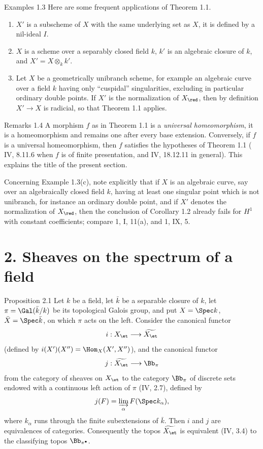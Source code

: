 \begin{remarktext}{Examples 1.3}
Here are some frequent applications of Theorem 1.1.
\begin{enumerate}[label=\alph*)]
\item \(X'\) is a subscheme of \(X\) with the same underlying set as \(X\), \ie it is defined by a nil-ideal \(I\).
\item \(X\) is a scheme over a separably closed field \(k\), \(k'\) is an algebraic closure of \(k\), and \(X'=X\otimes_k k'\).
\item Let \(X\) be a geometrically unibranch scheme, for example an algebraic curve over a field \(k\) having only ``cuspidal'' singularities, excluding in particular ordinary double points. If \(X'\) is the normalization of \(X_{\red}\), then by definition \(X'\to X\) is radicial, so that Theorem 1.1 applies.
\end{enumerate}
\end{remarktext}

\begin{remarktext}{Remarks 1.4}
A morphism \(f\) as in Theorem 1.1 is a \emph{universal homeomorphism}, \ie it is a homeomorphism and remains one after every base extension. Conversely, if \(f\) is a universal homeomorphism, then \(f\) satisfies the hypotheses of Theorem 1.1 (\cf \EGA{} IV, 8.11.6 when \(f\) is of finite presentation, and \EGA{} IV, 18.12.11 in general). This explains the title of the present section.

Concerning Example 1.3(c), note explicitly that if \(X\) is an algebraic curve, say over an algebraically closed field \(k\), having at least one singular point which is not unibranch, for instance an ordinary double point, and if \(X'\) denotes the normalization of \(X_{\red}\), then the conclusion of Corollary 1.2 already fails for \(H^1\) with constant coefficients; compare \SGA{} 1, I, 11(a), and \SGA{} 1, IX, 5.
\end{remarktext}

\section*{2. Sheaves on the spectrum of a field}

\begin{statement}{Proposition 2.1}
Let \(k\) be a field, let \(\bar{k}\) be a separable closure of \(k\), let \(\pi=\Gal(\bar{k}/k)\) be its topological Galois group, and put \(X=\Spec k\), \(\bar X=\Spec\bar k\), on which \(\pi\) acts on the left. Consider the canonical functor
\[
i:X_{\et}\longrightarrow \widetilde{X_{\et}}
\]
(defined by \(i(X')(X'')=\Hom_X(X',X'')\)), and the canonical functor
\[
j:\widetilde{X_{\et}}\longrightarrow \Bb_\pi
\]
from the category of sheaves on \(X_{\et}\) to the category \(\Bb_\pi\) of discrete sets endowed with a continuous left action of \(\pi\) (\cf IV, 2.7), defined by
\[
j(F)=\varinjlim_\alpha F(\Spec k_\alpha),
\]
where \(k_\alpha\) runs through the finite subextensions of \(\bar k\). Then \(i\) and \(j\) are equivalences of categories. Consequently the topos \(\widetilde{X_{\et}}\) is equivalent (IV, 3.4) to the classifying topos \(\Bb_{\pi^{\bullet}}\).
\end{statement}

